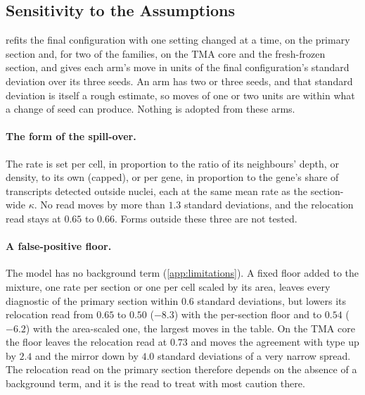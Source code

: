 

\subsection{Sensitivity to the Assumptions}
\label{app:sensitivity}



 refits the final configuration with one setting changed at a time, on the primary section and, for two of the families, on the TMA core and the fresh-frozen section, and gives each arm's move in units of the final configuration's standard deviation over its three seeds. An arm has two or three seeds, and that standard deviation is itself a rough estimate, so moves of one or two units are within what a change of seed can produce. Nothing is adopted from these arms.

\paragraph{The form of the spill-over.} The rate is set per cell, in proportion to the ratio of its neighbours' depth, or density, to its own (capped), or per gene, in proportion to the gene's share of transcripts detected outside nuclei, each at the same mean rate as the section-wide $\kappa$. No read moves by more than $1.3$ standard deviations, and the relocation read stays at $0.65$ to $0.66$. Forms outside these three are not tested.

\paragraph{A false-positive floor.} The model has no background term (\cref{app:limitations}). A fixed floor added to the mixture, one rate per section or one per cell scaled by its area, leaves every diagnostic of the primary section within $0.6$ standard deviations, but lowers its relocation read from $0.65$ to $0.50$ ($-8.3$) with the per-section floor and to $0.54$ ($-6.2$) with the area-scaled one, the largest moves in the table. On the TMA core the floor leaves the relocation read at $0.73$ and moves the agreement with type up by $2.4$ and the mirror down by $4.0$ standard deviations of a very narrow spread. The relocation read on the primary section therefore depends on the absence of a background term, and it is the read to treat with most caution there.

